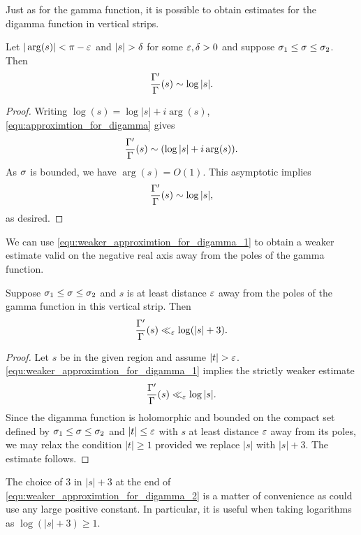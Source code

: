 \documentclass[12pt]{article}
\begin{document}
    Just as for the gamma function, it is possible to obtain estimates for the digamma function in vertical strips.

    \begin{corollary}\label{equ:weaker_approximtion_for_digamma_1}
      Let \(|\arg(s)| < \pi-\varepsilon\) and \(|s| > \delta\) for some \(\varepsilon,\delta > 0\) and suppose \(\sigma_{1} \le \sigma \le \sigma_{2}\). Then
      \[
        \frac{\Gamma'}{\Gamma}(s) \sim \log|s|.
      \]
    \end{corollary}
    \begin{proof}
      Writing \(\log(s) = \log|s|+i\arg(s)\), \cref{equ:approximtion_for_digamma} gives
      \[
        \frac{\Gamma'}{\Gamma}(s) \sim (\log|s|+i\arg(s)).
      \]
      As \(\sigma\) is bounded, we have \(\arg(s) = O(1)\). This asymptotic implies
      \[
        \frac{\Gamma'}{\Gamma}(s) \sim \log|s|,
      \]
      as desired.
    \end{proof}

    We can use \cref{equ:weaker_approximtion_for_digamma_1} to obtain a weaker estimate valid on the negative real axis away from the poles of the gamma function.

    \begin{corollary}\label{equ:weaker_approximtion_for_digamma_2}
      Suppose \(\sigma_{1} \le \sigma \le \sigma_{2}\) and \(s\) is at least distance \(\varepsilon\) away from the poles of the gamma function in this vertical strip. Then
      \[
        \frac{\Gamma'}{\Gamma}(s) \ll_{\varepsilon} \log(|s|+3).
      \]
    \end{corollary}
    \begin{proof}
      Let \(s\) be in the given region and assume \(|t| > \varepsilon\). \cref{equ:weaker_approximtion_for_digamma_1} implies the strictly weaker estimate
      \[
        \frac{\Gamma'}{\Gamma}(s) \ll_{\varepsilon} \log|s|.
      \]
      Since the digamma function is holomorphic and bounded on the compact set defined by \(\sigma_{1} \le \sigma \le \sigma_{2}\) and \(|t| \le \varepsilon\) with \(s\) at least distance \(\varepsilon\) away from its poles, we may relax the condition \(|t| \ge 1\) provided we replace \(|s|\) with \(|s|+3\). The estimate follows.
    \end{proof}

    The choice of \(3\) in \(|s|+3\) at the end of \cref{equ:weaker_approximtion_for_digamma_2} is a matter of convenience as could use any large positive constant. In particular, it is useful when taking logarithms as \(\log(|s|+3) \ge 1\).
\end{document}
